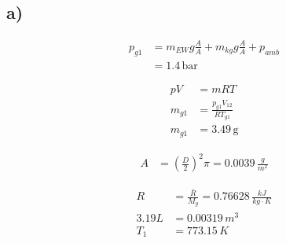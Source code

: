 

\subsection*{a)}
\begin{align*}
    p_{g1} &= m_{EW} g \frac{A}{A} + m_{kg} g \frac{A}{A} + p_{amb} \\
    &= 1.4 \, \text{bar}
\end{align*}

\begin{align*}
    pV &= mRT \\
    m_{g1} &= \frac{p_{g1} V_{12}}{R T_{g1}} \\
    m_{g1} &= 3.49 \, \text{g}
\end{align*}

\begin{align*}
    A &= (\frac{D}{2})^2 \pi = 0.0039 \, \frac{g}{m^2}
\end{align*}

\begin{align*}
    R &= \frac{\bar{R}}{M_g} = 0.76628 \, \frac{kJ}{kg \cdot K} \\
    3.19L &= 0.00319 \, m^3 \\
    T_1 &= 773.15 \, K
\end{align*}